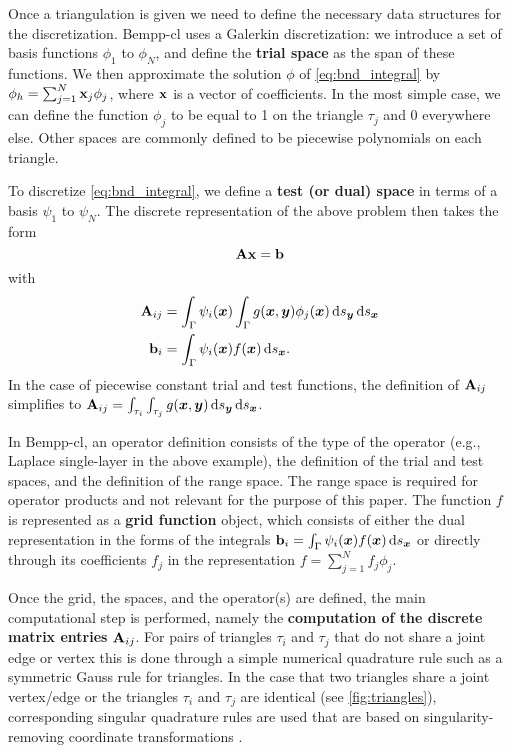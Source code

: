 Once a triangulation is given we need to define the necessary data structures for the discretization. Bempp-cl uses a Galerkin discretization: we introduce a set of basis functions \(\phi_1\) to \(\phi_N\), and define the \textbf{trial space} as the span of these functions. We then approximate the solution \(\phi\) of \cref{eq:bnd_integral} by $\phi_h=\sum_{j=1}^N \mathbf{x}_j\phi_j$, where $\mathbf{x}$ is a vector of coefficients. In the most simple case, we can define the function \(\phi_j\) to be equal to 1 on the triangle $\tau_j$ and 0 everywhere else. Other spaces are commonly defined to be piecewise polynomials on each triangle.

To discretize \cref{eq:bnd_integral}, we define a \textbf{test (or dual) space} in terms of a basis \(\psi_1\) to \(\psi_N\). The discrete representation of the above problem then takes the form
$$
\mathbf{A}\mathbf{x} = \mathbf{b}
$$
with
\begin{align*}
\dmat{A}_{ij} &= \int_{\Gamma}\psi_i(\bx)\int_{\Gamma}g(\bx, \by)\phi_j(\bx)\ds[\by]\ds[\bx]\\
\dvec{b}_i &= \int_{\Gamma}\psi_i(\bx)f(\bx)\ds[\bx].
\end{align*}
In the case of piecewise constant trial and test functions, the definition of $\mathbf{A}_{ij}$ simplifies to $\dmat{A}_{ij} = \int_{\tau_i}\int_{\tau_j}g(\bx, \by)\ds[\by]\ds[\bx]$.

In Bempp-cl, an operator definition consists of the type of the operator (e.g., Laplace single-layer in the above example),
the definition of the trial and test spaces, and the definition of the range space. The range space is required for operator
products and not relevant for the purpose of this paper. The function $f$ is represented as a \textbf{grid function} object, which
consists of either the dual representation in the forms of the integrals $\dvec{b}_i = \int_{\Gamma}\psi_i(\bx)f(\bx)\ds[\bx]$ or directly through its coefficients $f_j$ in the representation $f=\sum_{j=1}^N f_j\phi_j$.

Once the grid, the spaces, and the operator(s) are defined, the main computational step is performed, namely the \textbf{computation of the discrete matrix entries} $\mathbf{A}_{ij}$. For pairs of triangles $\tau_i$ and $\tau_j$ that do not share a joint edge or vertex this is done through a simple numerical quadrature rule such as a symmetric Gauss rule for triangles. In the case that two triangles share a joint vertex/edge or the triangles $\tau_i$ and $\tau_j$ are identical (see \cref{fig:triangles}), corresponding singular quadrature rules are used that are based on singularity-removing coordinate transformations \cite{erichsen}.

